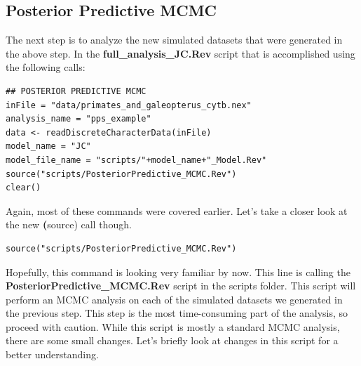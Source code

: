 \subsection{Posterior Predictive MCMC}

The next step is to analyze the new simulated datasets that were generated in the above step. In the 
\textbf{full\_analysis\_JC.Rev} script that is accomplished using the following calls:
{\tt \begin{snugshade*}
\begin{lstlisting}
## POSTERIOR PREDICTIVE MCMC
inFile = "data/primates_and_galeopterus_cytb.nex"
analysis_name = "pps_example"
data <- readDiscreteCharacterData(inFile)
model_name = "JC"
model_file_name = "scripts/"+model_name+"_Model.Rev"
source("scripts/PosteriorPredictive_MCMC.Rev")
clear()
\end{lstlisting}
\end{snugshade*}}

Again, most of these commands were covered earlier. Let's take a closer look at the new \textbf(source) call though.

{\tt \begin{snugshade*}
\begin{lstlisting}
source("scripts/PosteriorPredictive_MCMC.Rev")
\end{lstlisting}
\end{snugshade*}}

Hopefully, this command is looking very familiar by now. This line is calling the 
\textbf{PosteriorPredictive\_MCMC.Rev} script in the scripts folder. This script will perform an MCMC 
analysis on each of the simulated datasets we generated in the previous step. This step is the most 
time-consuming part of the analysis, so proceed with caution. While this script is mostly a standard 
MCMC analysis, there are some small changes. Let's briefly look at changes in this script for a better 
understanding.

